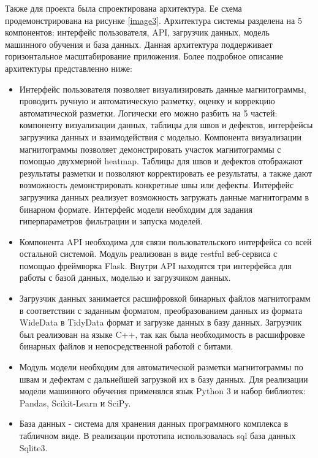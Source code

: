 \documentclass[a4paper,article,14pt]{extarticle}
\begin{document}
Также для проекта была спроектирована архитектура. Ее схема продемонстрирована на рисунке \ref{image3}. 
Архитектура системы разделена на 5 компонентов: интерфейс пользователя, API,  
загрузчик данных, модель машинного обучения и база данных. 
Данная архитектура поддерживает горизонтальное  масштабирование приложения.
Более подробное описание архитектуры представленно ниже:

\begin{itemize}
    \item Интерфейс пользователя позволяет визуализировать данные магнитограммы, проводить ручную и автоматическую разметку, оценку и коррекцию автоматической разметки. Логически его можно разбить на 5 частей: компоненту визуализации данных, таблицы для швов и дефектов, интерфейсы загрузчика данных и взаимодействия с моделью. Компонента визуализации магнитограммы позволяет демонстрировать участок магнитограммы с помощью двухмерной heatmap. Таблицы для швов и дефектов отображают результаты разметки и позволяют корректировать ее результаты, а также дают возможность демонстрировать конкретные швы или дефекты. Интерфейс загрузчика данных реализует возможность загружать данные магнитограмм в бинарном формате. Интерфейс модели необходим для задания гиперпараметров фильтрации и запуска моделей.
    \item Компонента API необходима для связи пользовательского интерфейса со всей остальной системой. Модуль реализован в виде restful веб-сервиса с помощью  фреймворка Flask. Внутри API находятся три интерфейса для работы с базой данных, моделью и загрузчиком данных.
    \item Загрузчик данных занимается расшифровкой бинарных файлов магнитограмм в соответствии с заданным форматом, преобразованием данных из формата WideData в TidyData формат  и загрузке данных в базу данных. Загрузчик был реализован на языке C++, так как была необходимость в расшифровке бинарных файлов и непосредственной работой с битами.
    \item Модуль модели необходим для автоматической разметки магнитограммы по швам и дефектам с дальнейшей загрузкой их в базу данных. Для реализации модели машинного обучения применялся язык Python 3 и набор библиотек: Pandas, Scikit-Learn и SciPy.
    \item База данных - система для хранения данных программного комплекса в табличном виде. В реализации прототипа использовалась sql база данных Sqlite3. 
\end{itemize}
\end{document}
